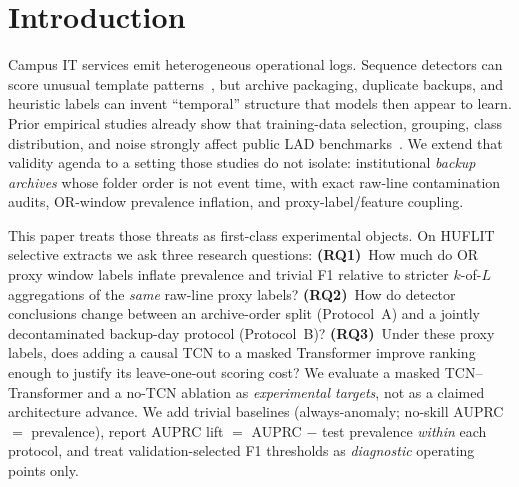 \documentclass[a4paper]{llncs}
\begin{document}
\section{Introduction}
Campus IT services emit heterogeneous operational logs. Sequence detectors can score unusual template patterns~\cite{ref_deeplog,ref_loganomaly,ref_logrobust,ref_swisslog}, but archive packaging, duplicate backups, and heuristic labels can invent ``temporal'' structure that models then appear to learn. Prior empirical studies already show that training-data selection, grouping, class distribution, and noise strongly affect public LAD benchmarks~\cite{ref_le_zhang_2022,ref_albert_2025}. We extend that validity agenda to a setting those studies do not isolate: institutional \emph{backup archives} whose folder order is not event time, with exact raw-line contamination audits, OR-window prevalence inflation, and proxy-label/feature coupling.

This paper treats those threats as first-class experimental objects. On HUFLIT selective extracts we ask three research questions:
\textbf{(RQ1)}~How much do OR proxy window labels inflate prevalence and trivial F1 relative to stricter $k$-of-$L$ aggregations of the \emph{same} raw-line proxy labels?
\textbf{(RQ2)}~How do detector conclusions change between an archive-order split (Protocol~A) and a jointly decontaminated backup-day protocol (Protocol~B)?
\textbf{(RQ3)}~Under these proxy labels, does adding a causal TCN to a masked Transformer improve ranking enough to justify its leave-one-out scoring cost?
We evaluate a masked TCN--Transformer and a no-TCN ablation as \emph{experimental targets}, not as a claimed architecture advance. We add trivial baselines (always-anomaly; no-skill AUPRC $=$ prevalence), report AUPRC lift $=$ AUPRC $-$ test prevalence \emph{within} each protocol, and treat validation-selected F1 thresholds as \emph{diagnostic} operating points only.
\end{document}
